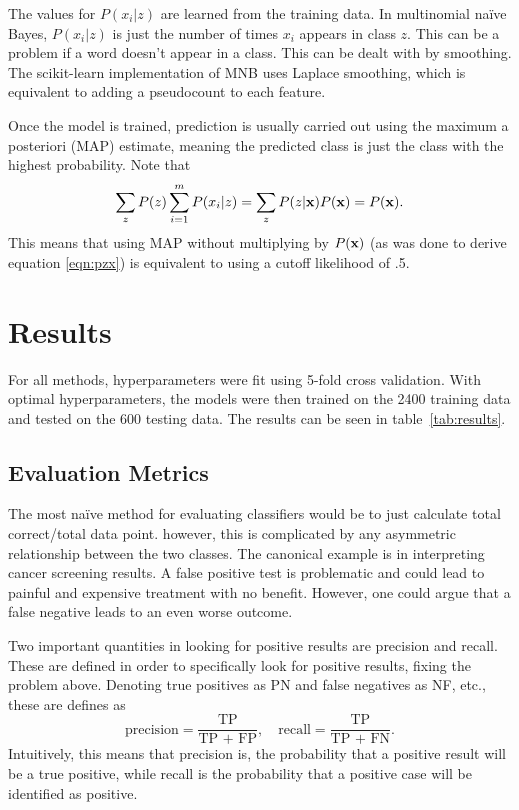\documentclass{article} %
\begin{document}
	The values for $P(x_i|z)$ are learned from the training data. In multinomial na\"ive Bayes, $P(x_i|z)$ is just the number of times $x_i$ appears in class $z$. This can be a problem if a word doesn't appear in a class. This can be dealt with by smoothing. The scikit-learn implementation of MNB uses Laplace smoothing, which is equivalent to adding a pseudocount to each feature. 
	
	Once the model is trained, prediction is usually carried out using the maximum a posteriori (MAP) estimate, meaning the predicted class is just the class with the highest probability. Note that 
	\begin{align}
	\sum_zP(z)\sum_{i=1}^mP(x_i|z) = \sum_zP(z|{\bf x})P({\bf x}) = P({\bf x}).
	\end{align}
	This means that using MAP without multiplying by $P({\bf x})$ (as was done to derive equation \ref{eqn:pzx}) is equivalent to using a cutoff likelihood of .5.
	
	\section{Results}
	
	For all methods, hyperparameters were fit using 5-fold cross validation. With optimal hyperparameters, the models were then trained on the 2400 training data and tested on the 600 testing data. The results can be seen in table~\ref{tab:results}.
	
	\subsection{Evaluation Metrics}
	
	The most na\"ive method for evaluating classifiers would be to just calculate total correct/total data point. however, this is complicated by any asymmetric relationship between the two classes. The canonical example is in interpreting cancer screening results. A false positive test is problematic and could lead to painful and expensive treatment with no benefit. However, one could argue that a false negative leads to an even worse outcome. 
	
	Two important quantities in looking for positive results are precision and recall. These are defined in order to specifically look for positive results, fixing the problem above. Denoting true positives as PN and false negatives as NF, etc., these are defines as 
	\begin{equation}
	\mbox{precision} = \frac{\mbox {TP}}{\mbox {TP + FP}},\quad \mbox{recall} = \frac{\mbox {TP}}{\mbox {TP + FN}}.
	\end{equation}
	Intuitively, this means that precision is, the probability that a positive result will be a true positive, while recall is the probability that a positive case will be identified as positive.
	
\end{document}
